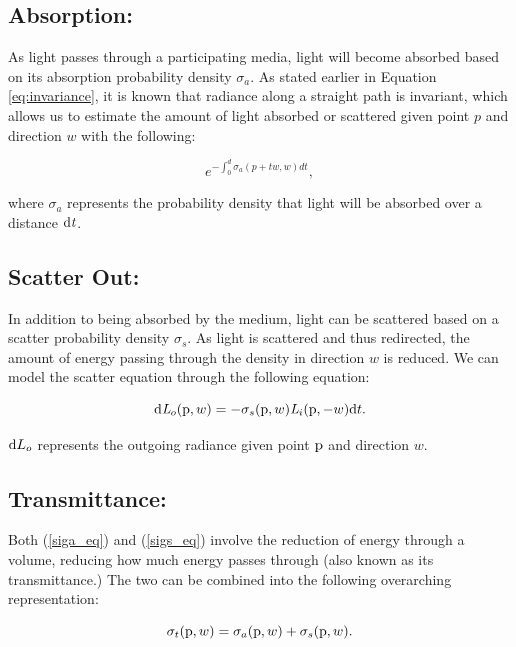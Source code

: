 \documentclass[12pt]{ucthesis}
\begin{document}
\subsection{Absorption:}
As light passes through a participating media, light will become absorbed based on its absorption probability density $\sigma_{a}$. As stated earlier in Equation \ref{eq:invariance}, it is known that radiance along a straight path is invariant, which allows us to estimate the amount of light absorbed or scattered given point $p$ and direction $w$ with the following:

\begin{equation}
e^{-\int_{0}^{d}\sigma_{a} (p+t\mathit{w},\mathit{w})d\mathit{t}},
\label{siga_eq}
\end{equation}

where $\sigma_{a}$ represents the probability density that light will be absorbed over a distance $\textup{d}\mathit{t}$.

\subsection{Scatter Out:}
In addition to being absorbed by the medium, light can be scattered based on a scatter probability density $\sigma_{s}$.  As light is scattered and thus redirected, the amount of energy passing through the density in direction $w$ is reduced.  We can model the scatter equation through the following equation:

\begin{equation}
\textup{d}\mathit{L}_{o}(\textup{p},w) = -\sigma_{s}(\textup{p},w) \mathit{L}_{i}(\textup{p},-w)\textup{d}t.
\label{sigs_eq}
\end{equation}

$\textup{d}L_{o}$ represents the outgoing radiance given point $\textup{p}$ and direction $w$.

\subsection{Transmittance:}
Both (\ref{siga_eq}) and (\ref{sigs_eq}) involve the reduction of energy through a volume, reducing how much energy passes through (also known as its transmittance.)  The two can be combined into the following overarching representation:

\begin{equation}
\sigma_{t}(\textup{p},w) = \sigma_{a}(\textup{p},w) + \sigma_{s}(\textup{p}, w).
\label{eq:sigt}
\end{equation}
\end{document}
